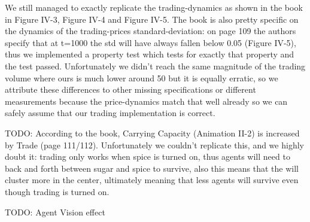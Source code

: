 We still managed to exactly replicate the trading-dynamics as shown in the book in Figure IV-3, Figure IV-4 and Figure IV-5. The book is also pretty specific on the dynamics of the trading-prices standard-deviation: on page 109 the authors specify that at t=1000 the std will have always fallen below 0.05 (Figure IV-5), thus we implemented a property test which tests for exactly that property and the test passed. Unfortunately we didn't reach the same magnitude of the trading volume where ours is much lower around 50 but it is equally erratic, so we attribute these differences to other missing specifications or different measurements because the price-dynamics match that well already so we can safely assume that our trading implementation is correct.

TODO: According to the book, Carrying Capacity (Animation II-2) is increased by Trade (page 111/112). Unfortunately we couldn't replicate this, and we highly doubt it: trading only works when spice is turned on, thus agents will need to back and forth between sugar and spice to survive, also this means that the will cluster more in the center, ultimately meaning that less agents will survive even though trading is turned on.

TODO: Agent Vision effect